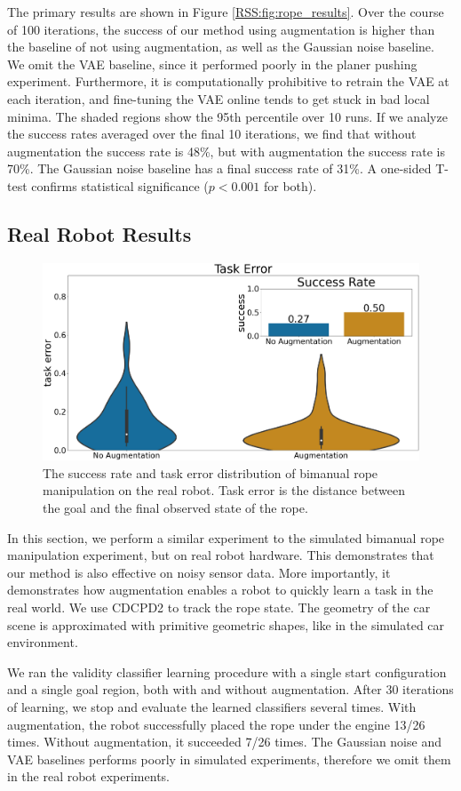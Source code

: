 The primary results are shown in Figure \ref{RSS:fig:rope_results}. Over the course of 100 iterations, the success of our method using augmentation is higher than the baseline of not using augmentation, as well as the Gaussian noise baseline. We omit the VAE baseline, since it performed poorly in the planer pushing experiment. Furthermore, it is computationally prohibitive to retrain the VAE at each iteration, and fine-tuning the VAE online tends to get stuck in bad local minima. The shaded regions show the 95th percentile over 10 runs. If we analyze the success rates averaged over the final 10 iterations, we find that without augmentation the success rate is 48\%, but with augmentation the success rate is 70\%. The Gaussian noise baseline has a final success rate of 31\%. A one-sided T-test confirms statistical significance ($p<0.001$ for both).

\subsection{Real Robot Results}
\label{RSS:sec:real_robot_results}

\begin{figure}
    \centering
    \includegraphics[width=0.7\linewidth]{Chap3/images/real_robot_task_error_success.png}
    \caption{The success rate and task error distribution of bimanual rope manipulation on the real robot. Task error is the distance between the goal and the final observed state of the rope.}
    \label{RSS:fig:real_robot_results}
\end{figure}

In this section, we perform a similar experiment to the simulated bimanual rope manipulation experiment, but on real robot hardware. This demonstrates that our method is also effective on noisy sensor data. More importantly, it demonstrates how augmentation enables a robot to quickly learn a task in the real world. We use CDCPD2 \cite{CDCPD2} to track the rope state. The geometry of the car scene is approximated with primitive geometric shapes, like in the simulated car environment.

We ran the validity classifier learning procedure with a single start configuration and a single goal region, both with and without augmentation. After 30 iterations of learning, we stop and evaluate the learned classifiers several times. With augmentation, the robot successfully placed the rope under the engine 13/26 times. Without augmentation, it succeeded 7/26 times. The Gaussian noise and VAE baselines performs poorly in simulated experiments, therefore we omit them in the real robot experiments.
